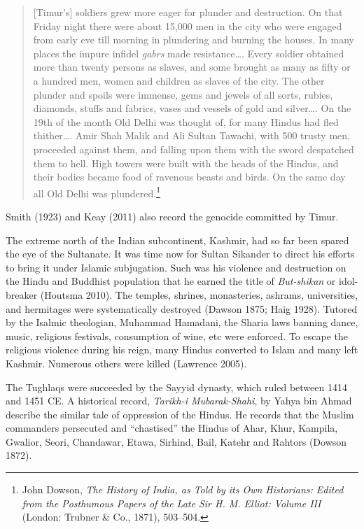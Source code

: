 \begin{quote}
[Timur's] soldiers grew more eager for plunder and destruction. On that Friday night there were about 15,000 men in the city who were engaged from early eve till morning in plundering and burning the houses. In many places the impure infidel \textit{gabrs} made resistance…. Every soldier obtained more than twenty persons as slaves, and some brought as many as fifty or a hundred men, women and children as slaves of the city. The other plunder and spoils were immense, gems and jewels of all sorts, rubies, diamonds, stuffs and fabrics, vases and vessels of gold and silver…. On the 19th of the month Old Delhi was thought of, for many Hindus had fled thither…. Amir Shah Malik and Ali Sultan Tawachi, with 500 trusty men, proceeded against them, and falling upon them with the sword despatched them to hell. High towers were built with the heads of the Hindus, and their bodies became food of ravenous beasts and birds. On the same day all Old Delhi was plundered.\footnote{John Dowson, \textit{The History of India, as Told by its Own Historians: Edited from the Posthumous Papers of the Late Sir H. M. Elliot: Volume III} (London: Trubner \& Co., 1871), 503--504.} 
\end{quote}
Smith (1923) and Keay (2011) also record the genocide committed by Timur. 

The extreme north of the Indian subcontinent, Kashmir, had so far been spared the eye of the Sultanate. It was time now for Sultan Sikander to direct his efforts to bring it under Islamic subjugation. Such was his violence and destruction on the Hindu and Buddhist population that he earned the title of \textit{But-shikan} or idol-breaker (Houtsma 2010). The temples, shrines, monasteries, ashrams, universities, and hermitages were systematically destroyed (Dawson 1875; Haig 1928). Tutored by the Isalmic theologian, Muhammad Hamadani, the Sharia laws banning dance, music, religious festivals, consumption of wine, etc were enforced. To escape the religious violence during his reign, many Hindus converted to Islam and many left Kashmir. Numerous others were killed (Lawrence 2005).

The Tughlaqs were succeeded by the Sayyid dynasty, which ruled between 1414 and 1451 CE. A historical record, \textit{Tarikh-i Mubarak-Shahi}, by Yahya bin Ahmad describe the similar tale of oppression of the Hindus. He records that the Muslim commanders persecuted and “chastised” the Hindus of Ahar, Khur, Kampila, Gwalior, Seori, Chandawar, Etawa, Sirhind, Bail, Katehr and Rahtors (Dowson 1872).

